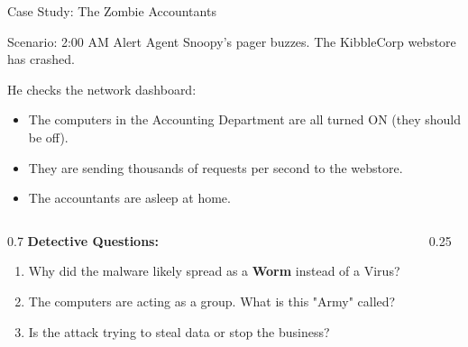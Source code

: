 \documentclass[aspectratio=169]{beamer}  %
\begin{document}
\begin{frame}{Case Study: The Zombie Accountants}
    \begin{block}{Scenario: 2:00 AM Alert}
        \footnotesize
        Agent Snoopy's pager buzzes. The KibbleCorp webstore has crashed.
        
        He checks the network dashboard:
        \begin{itemize}
            \item The computers in the Accounting Department are all turned ON (they should be off).
            \item They are sending thousands of requests per second to the webstore.
            \item The accountants are asleep at home.
        \end{itemize}
    \end{block}
    \vspace{0.3cm}
    \begin{columns}[T]
        \begin{column}{0.7\textwidth}
            \textbf{Detective Questions:}
            \begin{enumerate}
                \item Why did the malware likely spread as a \textbf{Worm} instead of a Virus?
                \item The computers are acting as a group. What is this "Army" called?
                \item Is the attack trying to steal data or stop the business?
            \end{enumerate}
        \end{column}
        \begin{column}{0.25\textwidth}
            \begin{center}
            \end{center}
        \end{column}
    \end{columns}
\end{frame}
\end{document}
